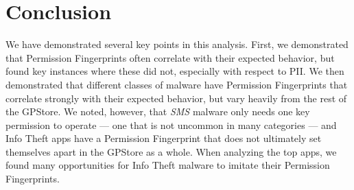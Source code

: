 \section{Conclusion}
We have demonstrated several key points in this analysis. First, we demonstrated that Permission Fingerprints often correlate with their expected behavior, but found key instances where these did not, especially with respect to PII. We then demonstrated that different classes of malware have Permission Fingerprints that correlate strongly with their expected behavior, but vary heavily from the rest of the GPStore. We noted, however, that \textit{SMS} malware only needs one key permission to operate --- one that is not uncommon in many categories --- and Info Theft apps have a Permission Fingerprint that does not ultimately set themselves apart in the GPStore as a whole. When analyzing the top apps, we found many opportunities for Info Theft malware to imitate their Permission Fingerprints.


